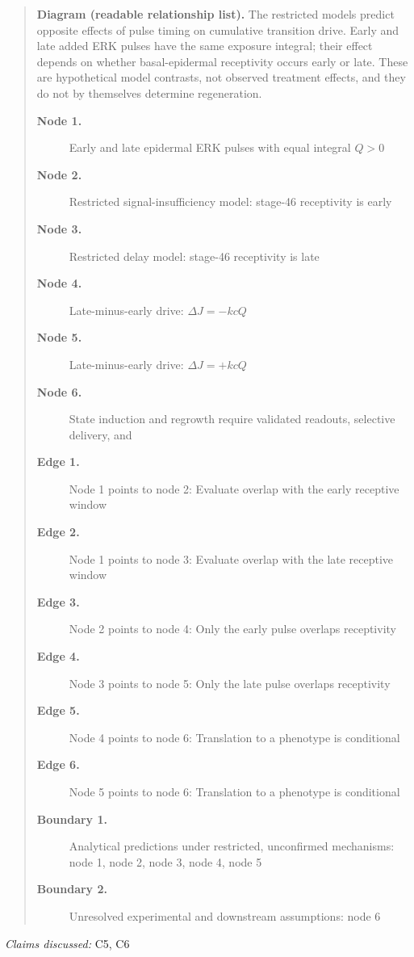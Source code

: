 \documentclass[11pt]{article}
\begin{document}
\begin{quote}
\textbf{Diagram (readable relationship list).} The restricted models predict opposite effects of pulse timing on cumulative transition drive. Early and late added ERK pulses have the same exposure integral; their effect depends on whether basal-epidermal receptivity occurs early or late. These are hypothetical model contrasts, not observed treatment effects, and they do not by themselves determine regeneration.
\begin{description}
\item[\textbf{Node 1.}] Early and late epidermal ERK pulses with equal integral $Q>0$
\item[\textbf{Node 2.}] Restricted signal-insufficiency model: stage-46 receptivity is early
\item[\textbf{Node 3.}] Restricted delay model: stage-46 receptivity is late
\item[\textbf{Node 4.}] Late-minus-early drive: $\Delta J=-kcQ$
\item[\textbf{Node 5.}] Late-minus-early drive: $\Delta J=+kcQ$
\item[\textbf{Node 6.}] State induction and regrowth require validated readouts, selective delivery, and
\item[\textbf{Edge 1.}] Node 1 points to node 2: Evaluate overlap with the early receptive window
\item[\textbf{Edge 2.}] Node 1 points to node 3: Evaluate overlap with the late receptive window
\item[\textbf{Edge 3.}] Node 2 points to node 4: Only the early pulse overlaps receptivity
\item[\textbf{Edge 4.}] Node 3 points to node 5: Only the late pulse overlaps receptivity
\item[\textbf{Edge 5.}] Node 4 points to node 6: Translation to a phenotype is conditional
\item[\textbf{Edge 6.}] Node 5 points to node 6: Translation to a phenotype is conditional
\item[\textbf{Boundary 1.}] Analytical predictions under restricted, unconfirmed mechanisms: node 1, node 2, node 3, node 4, node 5
\item[\textbf{Boundary 2.}] Unresolved experimental and downstream assumptions: node 6
\end{description}
\par{}
\end{quote}
\textit{Claims discussed: }C5, C6
\end{document}
